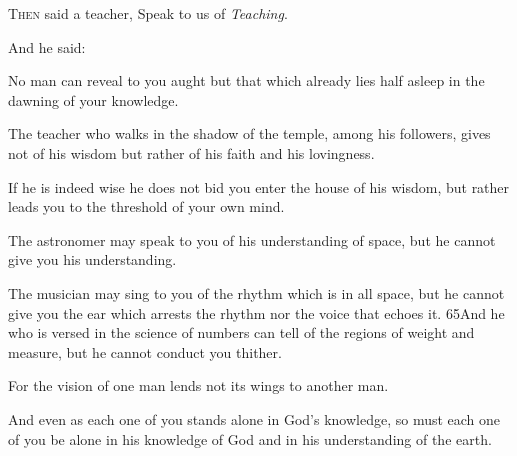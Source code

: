 \lettrine{T}{hen} said a teacher, Speak to us of
\textit{Teaching}.

\bigskip
And he said:

No man can reveal to you aught but that
which already lies half asleep in the
dawning of your knowledge.

The teacher who walks in the shadow of
the temple, among his followers, gives
not of his wisdom but rather of his
faith and his lovingness.

If he is indeed wise he does not bid
you enter the house of his wisdom, but
rather leads you to the threshold of
your own mind.

The astronomer may speak to you of his
understanding of space, but he cannot
give you his understanding.

The musician may sing to you of the
rhythm which is in all space, but he
cannot give you the ear which arrests
the rhythm nor the voice that echoes it.
{65}And he who is versed in the science
of numbers can tell of the regions
of weight and measure, but he cannot
conduct you thither.

For the vision of one man lends not its
wings to another man.

And even as each one of you stands alone
in God’s knowledge, so must each one of
you be alone in his knowledge of God and
in his understanding of the earth.